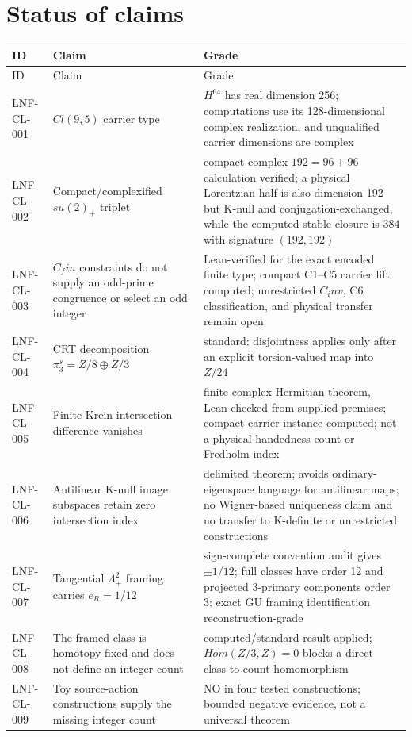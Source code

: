 \documentclass[11pt]{article}
\theoremstyle{remark}
\begin{document}
\section{Status of claims}
{\small
\begin{longtable}{P{0.14\textwidth}P{0.34\textwidth}P{0.43\textwidth}}
\toprule
ID & Claim & Grade \\
\midrule
\endfirsthead
\toprule
ID & Claim & Grade \\
\midrule
\endhead
LNF-CL-001 & $Cl(9,5)$ carrier type & $H^64$ has real dimension 256; computations use its 128-dimensional complex realization, and unqualified carrier dimensions are complex \\
LNF-CL-002 & Compact/complexified $su(2)_+$ triplet & compact complex $192=96+96$ calculation verified; a physical Lorentzian half is also dimension 192 but K-null and conjugation-exchanged, while the computed stable closure is $384$ with signature $(192,192)$ \\
LNF-CL-003 & $C_fin$ constraints do not supply an odd-prime congruence or select an odd integer & Lean-verified for the exact encoded finite type; compact C1--C5 carrier lift computed; unrestricted $C_inv$, C6 classification, and physical transfer remain open \\
LNF-CL-004 & CRT decomposition $\pi_3^s = Z/8 \oplus Z/3$ & standard; disjointness applies only after an explicit torsion-valued map into $Z/24$ \\
LNF-CL-005 & Finite Krein intersection difference vanishes & finite complex Hermitian theorem, Lean-checked from supplied premises; compact carrier instance computed; not a physical handedness count or Fredholm index \\
LNF-CL-006 & Antilinear K-null image subspaces retain zero intersection index & delimited theorem; avoids ordinary-eigenspace language for antilinear maps; no Wigner-based uniqueness claim and no transfer to K-definite or unrestricted constructions \\
LNF-CL-007 & Tangential $\Lambda^2_+$ framing carries $e_R = 1/12$ & sign-complete convention audit gives $\pm1/12$; full classes have order 12 and projected 3-primary components order 3; exact GU framing identification reconstruction-grade \\
LNF-CL-008 & The framed class is homotopy-fixed and does not define an integer count & computed/standard-result-applied; $Hom(Z/3,Z)=0$ blocks a direct class-to-count homomorphism \\
LNF-CL-009 & Toy source-action constructions supply the missing integer count & NO in four tested constructions; bounded negative evidence, not a universal theorem \\

\end{longtable}}
\end{document}
